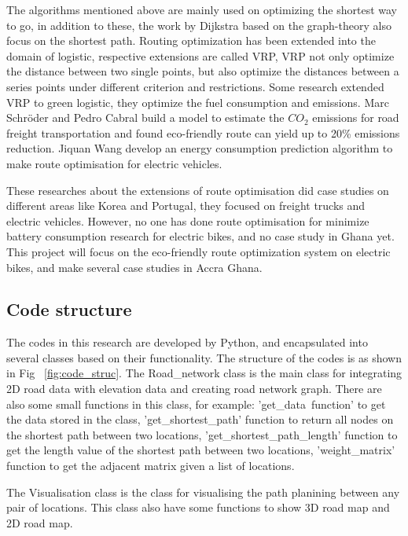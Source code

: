 \documentclass[final-report]{report-template}
\begin{document}
The algorithms mentioned above are mainly used on optimizing the shortest way to go, in addition to these, the work by Dijkstra based on the graph-theory also focus on the shortest path.
Routing optimization has been extended into the domain of logistic, respective extensions are called VRP\cite{BRAEKERS2016300}, VRP not only optimize the distance between two single points,
but also optimize the distances between a series points under different criterion and restrictions. 
Some research extended VRP to green logistic, they optimize the fuel consumption and emissions\cite{green_vehicle}.
Marc Schröder and Pedro Cabral\cite{article} build a model to estimate the $CO_2$ emissions for road freight transportation and found eco-friendly route can yield up to 20\% emissions reduction.
Jiquan Wang\cite{battery_predict} develop an energy consumption prediction algorithm to make route optimisation for electric vehicles.

These researches about the extensions of route optimisation did case studies on different areas like Korea and Portugal, they focused on freight trucks and electric vehicles.
However, no one has done route optimisation for minimize battery consumption research for electric bikes, and no case study in Ghana yet. 
This project will focus on the eco-friendly route optimization system on electric bikes, and make several case studies in Accra Ghana.

\subsection{Code structure}
The codes in this research are developed by Python, and encapsulated into several classes based on their functionality.
The structure of the codes is as shown in Fig~ \ref{fig:code_struc}.
The Road\_network class is the main class for integrating 2D road data with elevation data and creating road network graph.
There are also some small functions in this class, 
for example: 'get\_data\ function' to get the data stored in the class, 
'get\_shortest\_path' function to return all nodes on the shortest path between two locations,
'get\_shortest\_path\_length' function to get the length value of the shortest path between two locations,
'weight\_matrix' function to get the adjacent matrix given a list of locations. 

The Visualisation class is the class for visualising the path planining between any pair of locations.
This class also have some functions to show 3D road map and 2D road map.
\end{document}
